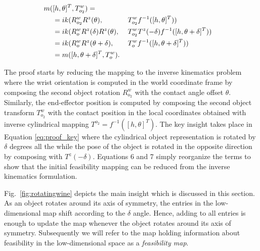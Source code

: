 \documentclass[a4paper,10pt,twocolumn]{article}
\begin{document}
\begin{alignat}{2}
  m(&[h,\theta]^T,T^w_{o_2}) 	=	\notag \\
				&= ik(R^w_{o_2} R^z(\theta), 			&&T^w_{o_2} f^{-1}([h,\theta]^T)) \\
				&= ik(R^w_o R^z(\delta) R^z(\theta), 		~&&T^w_{o_2} T^z(-\delta) f^{-1}([h,\theta+\delta]^T)) \label{eq:proof_key} \\
				&= ik(R^w_o R^z(\theta+\delta), 		&&T^w_o f^{-1}([h,\theta+\delta]^T)) \\
				&= m([h,\theta+\delta]^T, T^w_o). 				
\end{alignat}

The proof starts by reducing the mapping to the inverse kinematics problem where the wrist orientation is computed
in the world coordinate frame by composing the second object rotation $R^w_{o_2}$ with the contact angle offset $\theta$. Similarly,
the end-effector position is computed by composing the second object transform $T^w_{o_2}$ with the contact position
in the local coordinates obtained with inverse cylindrical mapping $T^{o_2} = f^{-1}([h,\theta]^T)$. The key
insight takes place in Equation \ref{eq:proof_key} where the cylindrical object representation is rotated by $\delta$
degrees all the while the pose of the object is rotated in the opposite direction by composing with
$T^z(-\delta)$. Equations 6 and 7 simply reorganize the terms to show that the initial feasibility
mapping can be reduced from the inverse kinematics formulation.

Fig.~\ref{fig:rotatingwine} depicts the main insight which is discussed in this section. As an object rotates around its axis of symmetry, the entries in the low-dimensional map shift according to the $\delta$ angle. Hence, adding to all entries is enough to update the map whenever the object rotates around its axis of symmetry. Subsequently we will refer to the map holding information about feasibility in the low-dimensional space as a \emph{feasibility map}. 
\end{document}

